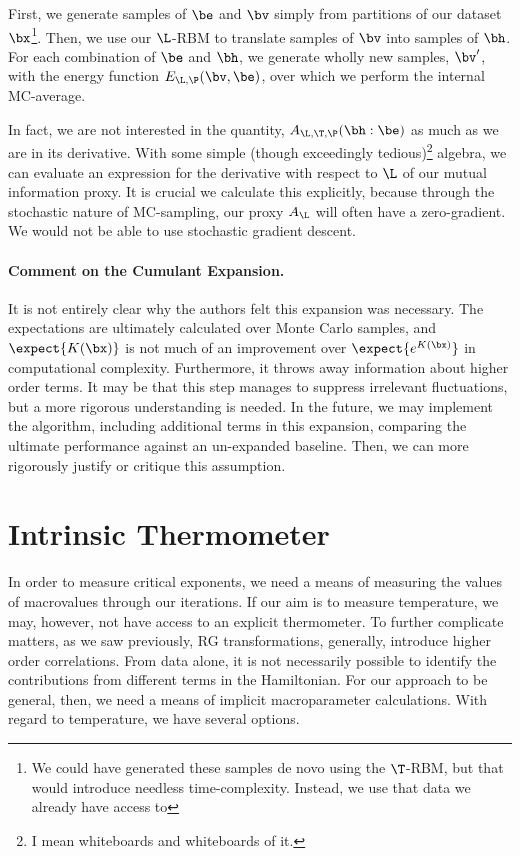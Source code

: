 First, we generate samples of $\be$ and $\bv$ simply from partitions
of our dataset $\bx$\footnote{We could have generated these samples de
  novo using the $\T$-RBM, but that would introduce needless
  time-complexity. Instead, we use that data we already have access
  to}. Then, we use our $\L$-RBM to translate samples of $\bv$ into
samples of $\bh$. For each combination of $\be$ and $\bh$, we generate
wholly new samples, $\bv'$, with the energy function
$E_{\L,\P}(\bv,\be)$, over which we perform the internal MC-average.

In fact, we are not interested in the quantity,
$A_{\L,\T,\P}(\bh:\be)$ as much as we are in its derivative. With some
simple (though exceedingly tedious)\footnote{I mean whiteboards and
  whiteboards of it.} algebra, we can evaluate an expression for the
derivative with respect to $\L$ of our mutual information proxy.  It
is crucial we calculate this explicitly, because through the
stochastic nature of MC-sampling, our proxy $A_{\L}$ will often have a
zero-gradient.  We would not be able to use stochastic gradient
descent.

\paragraph{Comment on the Cumulant Expansion.} It is not entirely
clear why the authors felt this expansion was necessary. The
expectations are ultimately calculated over Monte Carlo samples, and
$\expect{K(\bx)}$ is not much of an improvement over
$\expect{e^{K(\bx)}}$ in computational complexity. Furthermore, it
throws away information about higher order terms. It may be that this
step manages to suppress irrelevant fluctuations, but a more rigorous
understanding is needed. In the future, we may implement the
algorithm, including additional terms in this expansion, comparing the
ultimate performance against an un-expanded baseline. Then, we can
more rigorously justify or critique this assumption.

\section{Intrinsic Thermometer}\label{sec:thermometer}
In order to measure critical exponents, we need a means of measuring
the values of macrovalues through our iterations. If our aim is to
measure temperature, we may, however, not have access to an explicit
thermometer. To further complicate matters, as we saw previously, RG
transformations, generally, introduce higher order correlations. From
data alone, it is not necessarily possible to identify the
contributions from different terms in the Hamiltonian. For our
approach to be general, then, we need a means of implicit
macroparameter calculations. With regard to temperature, we have
several options.

